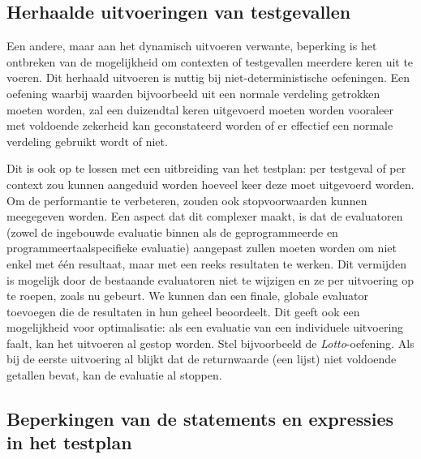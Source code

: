 \subsection{Herhaalde uitvoeringen van testgevallen}\label{subsec:herhaalde-uitvoeringen-van-testgevallen}

Een andere, maar aan het dynamisch uitvoeren verwante, beperking is het ontbreken van de mogelijkheid om contexten of testgevallen meerdere keren uit te voeren.
Dit herhaald uitvoeren is nuttig bij niet-deterministische oefeningen.
Een oefening waarbij waarden bijvoorbeeld uit een normale verdeling getrokken moeten worden, zal een duizendtal keren uitgevoerd moeten worden vooraleer met voldoende zekerheid kan geconstateerd worden of er effectief een normale verdeling gebruikt wordt of niet.

Dit is ook op te lossen met een uitbreiding van het testplan: per testgeval of per context zou kunnen aangeduid worden hoeveel keer deze moet uitgevoerd worden.
Om de performantie te verbeteren, zouden ook stopvoorwaarden kunnen meegegeven worden.
Een aspect dat dit complexer maakt, is dat de evaluatoren (zowel de ingebouwde evaluatie binnen \tested{} als de geprogrammeerde en programmeertaalspecifieke evaluatie) aangepast zullen moeten worden om niet enkel met één resultaat, maar met een reeks resultaten te werken.
Dit vermijden is mogelijk door de bestaande evaluatoren niet te wijzigen en ze per uitvoering op te roepen, zoals nu gebeurt.
We kunnen dan een finale, globale evaluator toevoegen die de resultaten in hun geheel beoordeelt.
Dit geeft ook een mogelijkheid voor optimalisatie: als een evaluatie van een individuele uitvoering faalt, kan het uitvoeren al gestop worden.
Stel bijvoorbeeld de \emph{Lotto}-oefening.
Als bij de eerste uitvoering al blijkt dat de returnwaarde (een lijst) niet voldoende getallen bevat, kan de evaluatie al stoppen.

\subsection{Beperkingen van de statements en expressies in het testplan}\label{subsec:beperkte-expressies-in-het-testplan}

